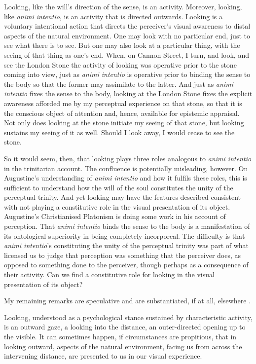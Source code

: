 \documentclass[12pt]{article}
\begin{document}
Looking, like the will's direction of the sense, is an activity. Moreover, looking, like \emph{animi intentio}, is an activity that is directed outwards. Looking is a voluntary intentional action that directs the perceiver's visual awareness to distal aspects of the natural environment. One may look with no particular end, just to see what there is to see. But one may also look at a particular thing, with the seeing of that thing as one's end. When, on Cannon Street, I turn, and look, and see the London Stone the activity of looking was operative prior to the stone coming into view, just as \emph{animi intentio} is operative prior to binding the sense to the body so that the former may assimilate to the latter. And just as \emph{animi intentio} fixes the sense to the body, looking at the London Stone fixes the explicit awareness afforded me by my perceptual experience on that stone, so that it is the conscious object of attention and, hence, available for epistemic appraisal. Not only does looking at the stone initiate my seeing of that stone, but looking sustains my seeing of it as well. Should I look away, I would cease to see the stone.

So it would seem, then, that looking plays three roles analogous to \emph{animi intentio} in the trinitarian account. The confluence is potentially misleading, however. On Augustine's understanding of \emph{animi intentio} and how it fulfils these roles, this is sufficient to understand how the will of the soul constitutes the unity of the perceptual trinity. And yet looking may have the features described consistent with not playing a constitutive role in the visual presentation of its object. Augustine's Christianised Platonism is doing some work in his account of perception. That \emph{animi intentio} binds the sense to the body is a manifestation of its ontological superiority in being completely incorporeal. The difficulty is that \emph{animi intentio}'s constituting the unity of the perceptual trinity was part of what licensed us to judge that perception was something that the perceiver does, as opposed to something done to the perceiver, though perhaps as a consequence of their activity. Can we find a constitutive role for looking in the visual presentation of its object?

My remaining remarks are speculative and are substantiated, if at all, elsewhere \citep{Kalderon:2015aa}.

Looking, understood as a psychological stance sustained by characteristic activity, is an outward gaze, a looking into the distance, an outer-directed opening up to the visible. It can sometimes happen, if circumstances are propitious, that in looking outward, aspects of the natural environment, facing us from across the intervening distance, are presented to us in our visual experience. 
\end{document}
